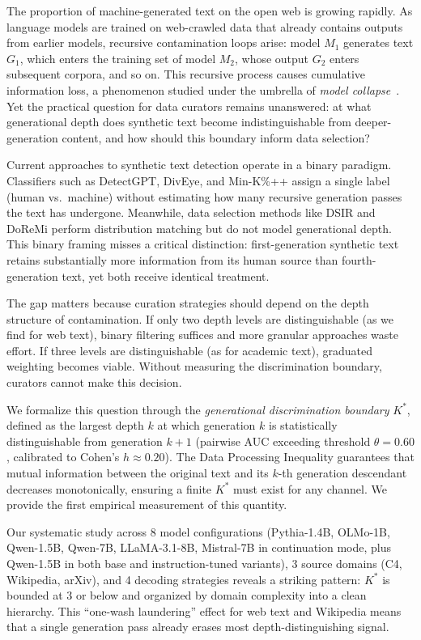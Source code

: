\documentclass[11pt]{article}
\begin{document}
The proportion of machine-generated text on the open web is growing rapidly. As language models are trained on web-crawled data that already contains outputs from earlier models, recursive contamination loops arise: model $M_1$ generates text $G_1$, which enters the training set of model $M_2$, whose output $G_2$ enters subsequent corpora, and so on. This recursive process causes cumulative information loss, a phenomenon studied under the umbrella of \emph{model collapse}~\citep{shumailov2024ai}. Yet the practical question for data curators remains unanswered: at what generational depth does synthetic text become indistinguishable from deeper-generation content, and how should this boundary inform data selection?

Current approaches to synthetic text detection operate in a binary paradigm. Classifiers such as DetectGPT, DivEye, and Min-K\%++ assign a single label (human vs.\ machine) without estimating how many recursive generation passes the text has undergone. Meanwhile, data selection methods like DSIR and DoReMi perform distribution matching but do not model generational depth. This binary framing misses a critical distinction: first-generation synthetic text retains substantially more information from its human source than fourth-generation text, yet both receive identical treatment.

The gap matters because curation strategies should depend on the depth structure of contamination. If only two depth levels are distinguishable (as we find for web text), binary filtering suffices and more granular approaches waste effort. If three levels are distinguishable (as for academic text), graduated weighting becomes viable. Without measuring the discrimination boundary, curators cannot make this decision.

We formalize this question through the \emph{generational discrimination boundary} $K^*$, defined as the largest depth $k$ at which generation $k$ is statistically distinguishable from generation $k{+}1$ (pairwise AUC exceeding threshold $\theta{=}0.60$, calibrated to Cohen's $h \approx 0.20$). The Data Processing Inequality guarantees that mutual information between the original text and its $k$-th generation descendant decreases monotonically, ensuring a finite $K^*$ must exist for any channel. We provide the first empirical measurement of this quantity.

Our systematic study across 8 model configurations (Pythia-1.4B, OLMo-1B, Qwen-1.5B, Qwen-7B, LLaMA-3.1-8B, Mistral-7B in continuation mode, plus Qwen-1.5B in both base and instruction-tuned variants), 3 source domains (C4, Wikipedia, arXiv), and 4 decoding strategies reveals a striking pattern: $K^*$ is bounded at 3 or below and organized by domain complexity into a clean hierarchy. This ``one-wash laundering'' effect for web text and Wikipedia means that a single generation pass already erases most depth-distinguishing signal.
\end{document}
